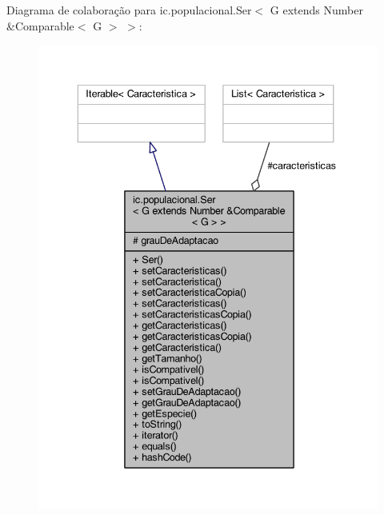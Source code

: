 Diagrama de colaboração para ic.\-populacional.\-Ser$<$ G extends Number \&Comparable$<$ G $>$ $>$\-:
\nopagebreak
\begin{figure}[H]
\begin{center}
\leavevmode
\includegraphics[width=339pt]{classic_1_1populacional_1_1_ser_3_01_g_01extends_01_number_01_6_comparable_3_01_g_01_4_01_4__coll__graph}
\end{center}
\end{figure}
